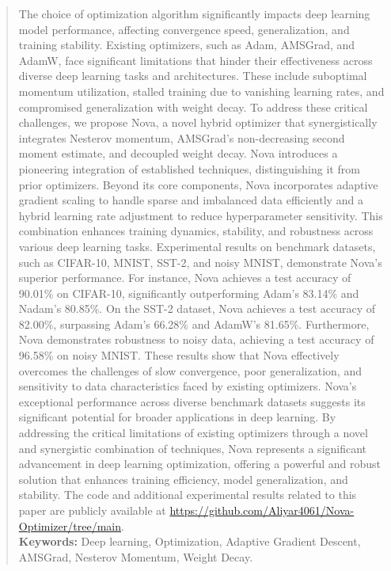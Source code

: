 \documentclass{article}
\begin{document}
\begin{abstract}
The choice of optimization algorithm significantly impacts deep learning model performance, affecting convergence speed, generalization, and training stability. Existing optimizers, such as Adam, AMSGrad, and AdamW, face significant limitations that hinder their effectiveness across diverse deep learning tasks and architectures. These include suboptimal momentum utilization, stalled training due to vanishing learning rates, and compromised generalization with weight decay. To address these critical challenges, we propose Nova, a novel hybrid optimizer that synergistically integrates Nesterov momentum, AMSGrad’s non-decreasing second moment estimate, and decoupled weight decay. Nova introduces a pioneering integration of established techniques, distinguishing it from prior optimizers. Beyond its core components, Nova incorporates adaptive gradient scaling to handle sparse and imbalanced data efficiently and a hybrid learning rate adjustment to reduce hyperparameter sensitivity. This combination enhances training dynamics, stability, and robustness across various deep learning tasks. Experimental results on benchmark datasets, such as CIFAR-10, MNIST, SST-2, and noisy MNIST, demonstrate Nova’s superior performance. For instance, Nova achieves a test accuracy of 90.01\% on CIFAR-10, significantly outperforming Adam’s 83.14\% and Nadam’s 80.85\%. On the SST-2 dataset, Nova achieves a test accuracy of 82.00\%, surpassing Adam's 66.28\% and AdamW's 81.65\%. Furthermore, Nova demonstrates robustness to noisy data, achieving a test accuracy of 96.58\% on noisy MNIST. These results show that Nova effectively overcomes the challenges of slow convergence, poor generalization, and sensitivity to data characteristics faced by existing optimizers. Nova’s exceptional performance across diverse benchmark datasets suggests its significant potential for broader applications in deep learning. By addressing the critical limitations of existing optimizers through a novel and synergistic combination of techniques, Nova represents a significant advancement in deep learning optimization, offering a powerful and robust solution that enhances training efficiency, model generalization, and stability. The code and additional experimental results related to this paper are publicly available at \url{https://github.com/Aliyar4061/Nova-Optimizer/tree/main}.\\

\noindent\textbf{Keywords:} Deep learning, Optimization, Adaptive Gradient Descent,  AMSGrad, Nesterov Momentum, Weight Decay.
\end{abstract}
\end{document}
